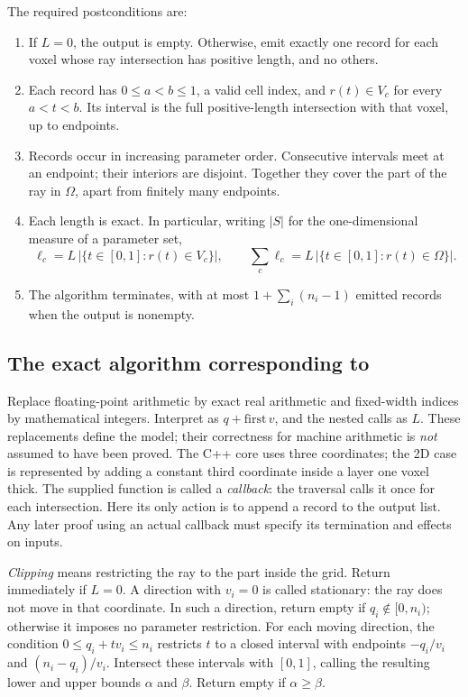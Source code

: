 The required postconditions are:
\begin{enumerate}
 \item If $L=0$, the output is empty. Otherwise, emit exactly one record for
 each voxel whose ray intersection has positive length, and no others.
 \item Each record has $0\leq a<b\leq1$, a valid cell index, and
 $r(t)\in V_c$ for every $a<t<b$. Its interval is the full positive-length
 intersection with that voxel, up to endpoints.
 \item Records occur in increasing parameter order. Consecutive intervals
 meet at an endpoint; their interiors are disjoint. Together they cover
 the part of the ray in $\Omega$, apart from finitely many endpoints.
 \item Each length is exact. In particular, writing $|S|$ for the
 one-dimensional measure of a parameter set,
 \[
   \ell_c=L\,|\{t\in[0,1]:r(t)\in V_c\}|,\qquad
   \sum_c\ell_c=L\,|\{t\in[0,1]:r(t)\in\Omega\}|.
 \]
 \item The algorithm terminates, with at most
 $1+\sum_i(n_i-1)$ emitted records when the output is nonempty.
\end{enumerate}
\subsection{The exact algorithm corresponding to \texorpdfstring{}{walk()}}
\label{app:exact-algorithm}
Replace floating-point arithmetic by exact real arithmetic and fixed-width
indices by mathematical integers. Interpret  as
$q+\mathrm{first}\,v$, and the nested  calls as $L$.
These replacements define the model; their correctness for machine
arithmetic is \emph{not} assumed to have been proved.
The C++ core uses three coordinates; the 2D case is represented by adding
a constant third coordinate inside a layer one voxel thick.
The supplied function  is called a \emph{callback}: the traversal
calls it once for each intersection. Here its only action is to append a
record to the output list. Any later proof using an actual callback must
specify its termination and effects on inputs.

\emph{Clipping} means restricting the ray to the part inside the grid.
Return immediately if $L=0$. A direction with $v_i=0$ is called stationary:
the ray does not move in that coordinate. In such a direction, return empty if
$q_i\notin[0,n_i)$; otherwise it imposes no parameter restriction. For each
moving direction, the condition $0\leq q_i+t v_i\leq n_i$ restricts $t$
to a closed interval with endpoints
$-q_i/v_i$ and $(n_i-q_i)/v_i$. Intersect these intervals with $[0,1]$,
calling the resulting lower and upper bounds $\alpha$ and $\beta$.
Return empty if $\alpha\geq\beta$.

